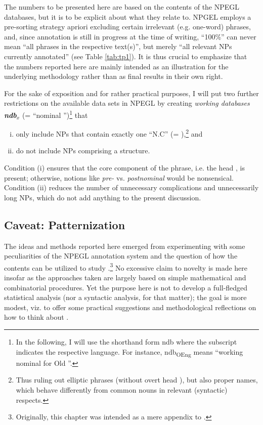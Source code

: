 \documentclass[output=paper,colorlinks,citecolor=brown,draft]{langscibook}
\begin{document}
The numbers to be presented here are based on the contents of the NPEGL databases, but it is  to be explicit about what they relate to.  NPGEL employs a pre-sorting strategy apriori excluding certain irrelevant (e.g. one-word)  phrases, and, since annotation is still in progress at the time of writing,  ``100\%'' can never mean ``all  phrases in the respective text(s)'', but merely ``all relevant NPs currently annotated'' (see Table \ref{tab:tp1}).  It is thus crucial to emphasize that the numbers reported here are mainly intended as an illustration for the underlying methodology rather than as final results in their own right.   

For the sake of exposition and for rather practical purposes, I will put two further restrictions on the available data sets in NPEGL by creating \textit{working databases \textbf{ndb$_x$}} (= ``nominal '')\footnote{In the following, I will use the shorthand form ndb where the subscript indicates the respective language. For instance, ndb\textsubscript{OEng} means ``working nominal  for Old ''. } that  
\begin{enumerate}[(i)]
    \item only include NPs that contain exactly one ``N.C'' (= ),\footnote{Thus ruling out elliptic  phrases (without overt head ), but also  proper names, which behave differently from common nouns in relevant (syntactic) respects. } and
    \item do not include NPs comprising a  structure.
\end{enumerate} 
Condition (i) ensures that the core component of the  phrase, i.e. the head , is present; otherwise, notions like \textit{pre-} vs. \textit{postnominal} would be nonsensical. 
Condition (ii) reduces the number of  unnecessary complications and unnecessarily long NPs, which do not add anything to the present discussion.  




\subsection{Caveat: Patternization }

The ideas and methods reported here emerged from experimenting with some peculiarities of the NPEGL annotation system and the question of how the  contents can be utilized to study  .\footnote{Originally, this chapter was intended as a mere appendix to .} No excessive claim to novelty is made here insofar as the approaches taken are largely based on simple mathematical and combinatorial procedures. Yet the purpose here is not to develop a full-fledged statistical analysis (nor a syntactic analysis, for that matter); the goal is more modest, viz. to offer some practical suggestions and methodological reflections on how to think about  . 
\end{document}
